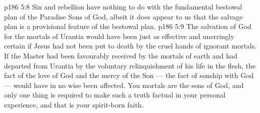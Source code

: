 \vs p186 5:8 Sin and rebellion have nothing to do with the fundamental bestowal plan of the Paradise Sons of God, albeit it does appear to us that the salvage plan is a provisional feature of the bestowal plan.
\vs p186 5:9 The salvation of God for the mortals of Urantia would have been just as effective and unerringly certain if Jesus had not been put to death by the cruel hands of ignorant mortals. If the Master had been favourably received by the mortals of earth and had departed from Urantia by the voluntary relinquishment of his life in the flesh, the fact of the love of God and the mercy of the Son --- the fact of sonship with God --- would have in no wise been affected. You mortals are the sons of God, and only one thing is required to make such a truth factual in your personal experience, and that is your spirit\hyp{}born faith.
